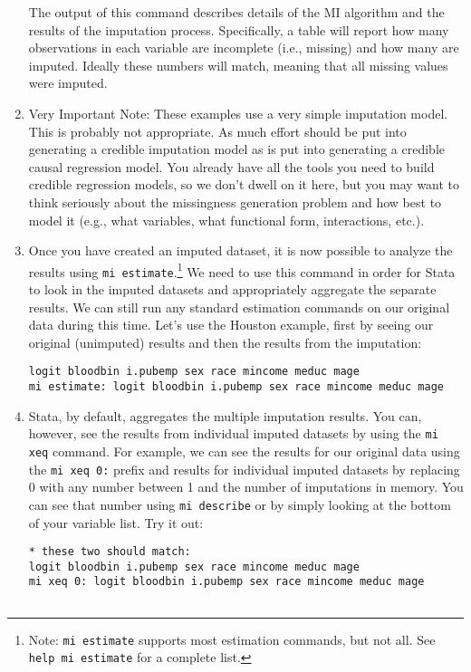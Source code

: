 \documentclass[a4paper,12pt]{article}
\begin{document}
\begin{enumerate}
The output of this command describes details of the MI algorithm and the results of the imputation process. Specifically, a table will report how many observations in each variable are incomplete (i.e., missing) and how many are imputed. Ideally these numbers will match, meaning that all missing values were imputed.

\item Very Important Note: These examples use a very simple imputation model. This is probably not appropriate. As much effort should be put into generating a credible imputation model as is put into generating a credible causal regression model. You already have all the tools you need to build credible regression models, so we don't dwell on it here, but you may want to think seriously about the missingness generation problem and how best to model it (e.g., what variables, what functional form, interactions, etc.).

\item Once you have created an imputed dataset, it is now possible to analyze the results using \texttt{mi estimate}.\footnote{Note: \texttt{mi estimate} supports most estimation commands, but not all. See \texttt{help mi estimate} for a complete list.} We need to use this command in order for Stata to look in the imputed datasets and appropriately aggregate the separate results. We can still run any standard estimation commands on our original data during this time. Let's use the Houston example, first by seeing our original (unimputed) results and then the results from the imputation:
\begin{verbatim}
logit bloodbin i.pubemp sex race mincome meduc mage
mi estimate: logit bloodbin i.pubemp sex race mincome meduc mage
\end{verbatim}

\item Stata, by default, aggregates the multiple imputation results. You can, however, see the results from individual imputed datasets by using the \texttt{mi xeq} command. For example, we can see the results for our original data using the \texttt{mi xeq 0:} prefix and results for individual imputed datasets by replacing 0 with any number between 1 and the number of imputations in memory. You can see that number using \texttt{mi describe} or by simply looking at the bottom of your variable list. Try it out:
\begin{verbatim}
* these two should match:
logit bloodbin i.pubemp sex race mincome meduc mage
mi xeq 0: logit bloodbin i.pubemp sex race mincome meduc mage


\end{verbatim}
\end{enumerate}
\end{document}
